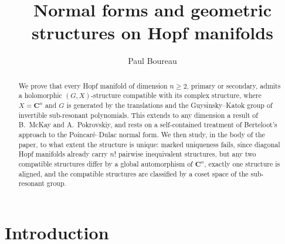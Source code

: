 \documentclass[english,11pt]{amsart}
\theoremstyle{definition}
\theoremstyle{remark}
\numberwithin{equation}{section}
\newcommand{\C}{\mathbf{C}}
\begin{document}
\title[Geometric structures on Hopf manifolds]{Normal forms and geometric structures on Hopf manifolds}
\author{Paul Boureau}


\address{AGM - CNRS - CY Cergy Paris Universit\'e}




\begin{abstract}
We prove that every Hopf manifold of dimension $n\geq2$, primary or secondary, admits a holomorphic $(G,X)$-structure compatible with its complex structure, where $X=\C^n$ and $G$ is generated by the translations and the Guysinsky--Katok group of invertible sub-resonant polynomials. This extends to any dimension a result of B.~McKay and A.~Pokrovskiy, and rests on a self-contained treatment of Berteloot's approach to the Poincar\'e--Dulac normal form. We then study, in the body of the paper, to what extent the structure is unique: marked uniqueness fails, since diagonal Hopf manifolds already carry $n!$ pairwise inequivalent structures, but any two compatible structures differ by a global automorphism of $\C^n$, exactly one structure is aligned, and the compatible structures are classified by a coset space of the sub-resonant group.
\end{abstract}


\maketitle

\tableofcontents

\section{Introduction}\label{s:intro}
\end{document}
